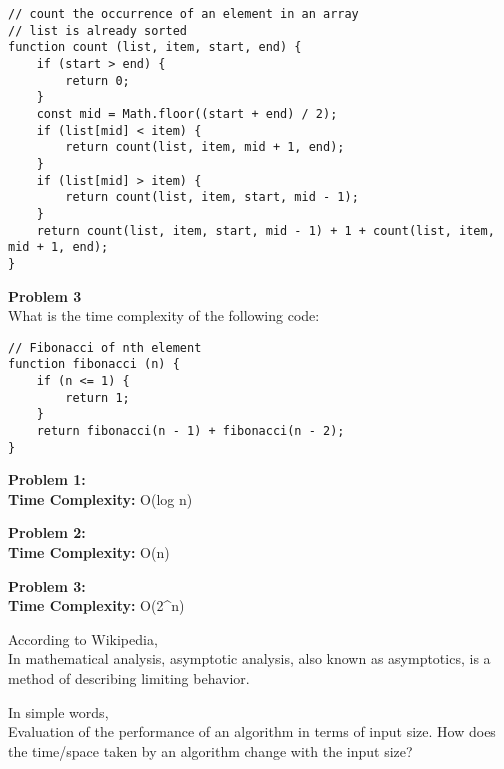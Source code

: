 \begin{verbatim}
// count the occurrence of an element in an array
// list is already sorted
function count (list, item, start, end) {
    if (start > end) {
        return 0;
    }
    const mid = Math.floor((start + end) / 2);
    if (list[mid] < item) {
        return count(list, item, mid + 1, end);
    }
    if (list[mid] > item) {
        return count(list, item, start, mid - 1);
    }
    return count(list, item, start, mid - 1) + 1 + count(list, item, mid + 1, end);
}
\end{verbatim}

\textbf{Problem 3}\\
What is the time complexity of the following code:

\begin{verbatim}
// Fibonacci of nth element
function fibonacci (n) {
    if (n <= 1) {
        return 1;
    }
    return fibonacci(n - 1) + fibonacci(n - 2);
}
\end{verbatim}

\hypertarget{4774}{\label{4774}}

\textbf{Problem 1:}\\
\textbf{Time Complexity:} O(log n)

\textbf{Problem 2:}\\
\textbf{Time Complexity:} O(n)

\textbf{Problem 3:}\\
\textbf{Time Complexity:} O(2\^{}n)

{}{}{}

\hypertarget{9dc8}{\label{9dc8}}

\hypertarget{ddc2}{\label{ddc2}}

According to Wikipedia,\\
In mathematical analysis, asymptotic analysis, also known as
asymptotics, is a method of describing limiting behavior.

In simple words,\\
Evaluation of the performance of an algorithm in terms of input size.
How does the time/space taken by an algorithm change with the input
size?

\hypertarget{38a6}{\label{38a6}}

